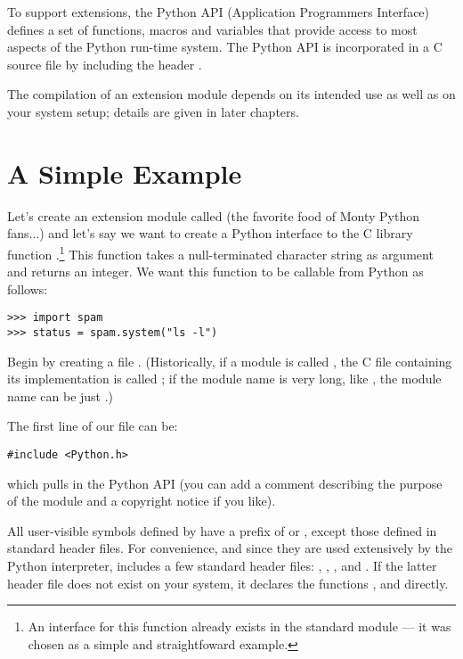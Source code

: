 \documentclass{manual}
\begin{document}
To support extensions, the Python API (Application Programmers
Interface) defines a set of functions, macros and variables that
provide access to most aspects of the Python run-time system.  The
Python API is incorporated in a C source file by including the header
.

The compilation of an extension module depends on its intended use as
well as on your system setup; details are given in later chapters.


\section{A Simple Example
         \label{simpleExample}}

Let's create an extension module called  (the favorite food
of Monty Python fans...) and let's say we want to create a Python
interface to the C library function .\footnote{An
interface for this function already exists in the standard module
 --- it was chosen as a simple and straightfoward example.}
This function takes a null-terminated character string as argument and
returns an integer.  We want this function to be callable from Python
as follows:

\begin{verbatim}
>>> import spam
>>> status = spam.system("ls -l")
\end{verbatim}

Begin by creating a file .  (Historically, if a
module is called , the C file containing its implementation
is called ; if the module name is very long, like
, the module name can be just .)

The first line of our file can be:

\begin{verbatim}
#include <Python.h>
\end{verbatim}

which pulls in the Python API (you can add a comment describing the
purpose of the module and a copyright notice if you like).

All user-visible symbols defined by  have a prefix of
 or , except those defined in standard header files.
For convenience, and since they are used extensively by the Python
interpreter,  includes a few standard header files:
, , , and
.  If the latter header file does not exist on your
system, it declares the functions ,
 and  directly.
\end{document}

